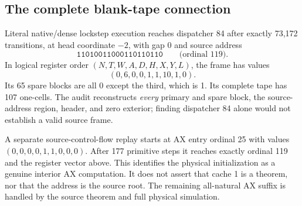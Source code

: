 \subsection{The complete blank-tape connection}
Literal native/dense lockstep execution reaches dispatcher 84 after exactly 73,172 transitions, at head coordinate $-2$, with gap 0 and source address
\[
\texttt{11010011000110110110}\qquad\text{(ordinal 119).}
\]
In logical register order $(N,T,W,A,D,H,X,Y,L)$, the frame has values
\[
(0,6,0,0,1,1,10,1,0).
\]
Its 65 spare blocks are all 0 except the third, which is 1. Its complete tape has 107 one-cells. The audit reconstructs \emph{every} primary and spare block, the source-address region, header, and zero exterior; finding dispatcher 84 alone would not establish a valid source frame.

A separate source-control-flow replay starts at AX entry ordinal 25 with values $(0,0,0,0,1,1,0,0,0)$. After 177 primitive steps it reaches exactly ordinal 119 and the register vector above. This identifies the physical initialization as a genuine interior AX computation. It does not assert that cache 1 is a theorem, nor that the address is the source root. The remaining all-natural AX suffix is handled by the source theorem and full physical simulation.
